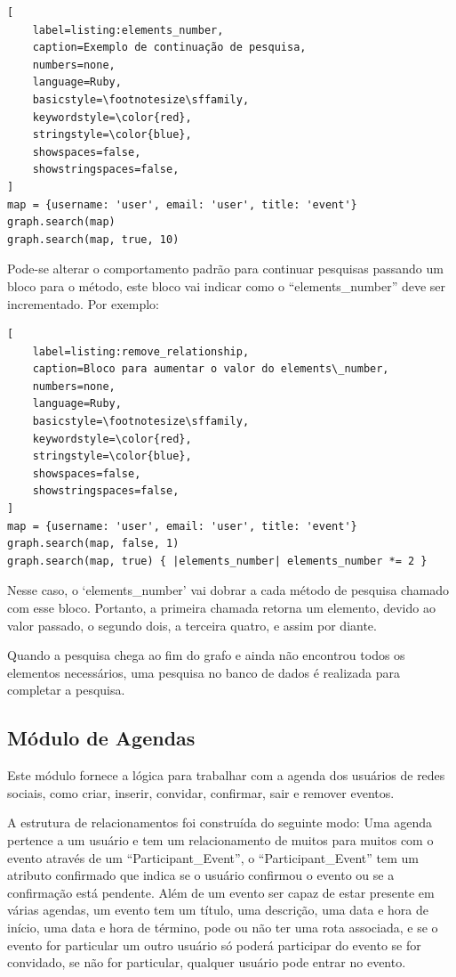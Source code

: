 \begin{lstlisting}[
    label=listing:elements_number,
    caption=Exemplo de continuação de pesquisa,
    numbers=none,
    language=Ruby,
    basicstyle=\footnotesize\sffamily,
    keywordstyle=\color{red},
    stringstyle=\color{blue},
    showspaces=false,
    showstringspaces=false,
]
map = {username: 'user', email: 'user', title: 'event'}
graph.search(map)
graph.search(map, true, 10)
\end{lstlisting}

Pode-se alterar o comportamento padrão para continuar pesquisas passando um bloco para o método, este bloco vai indicar como o ``elements\_number'' deve ser incrementado. Por exemplo:

\begin{lstlisting}[
    label=listing:remove_relationship,
    caption=Bloco para aumentar o valor do elements\_number,
    numbers=none,
    language=Ruby,
    basicstyle=\footnotesize\sffamily,
    keywordstyle=\color{red},
    stringstyle=\color{blue},
    showspaces=false,
    showstringspaces=false,
]
map = {username: 'user', email: 'user', title: 'event'}
graph.search(map, false, 1)
graph.search(map, true) { |elements_number| elements_number *= 2 }
\end{lstlisting}

Nesse caso, o `elements\_number' vai dobrar a cada método de pesquisa chamado com esse bloco. Portanto, a primeira chamada retorna um elemento, devido ao valor passado, o segundo dois, a terceira quatro, e assim por diante.

Quando a pesquisa chega ao fim do grafo e ainda não encontrou todos os elementos necessários, uma pesquisa no banco de dados é realizada para completar a pesquisa.

\subsection{Módulo de Agendas}

Este módulo fornece a lógica para trabalhar com a agenda dos usuários de redes sociais, como criar, inserir, convidar, confirmar, sair e remover eventos.

A estrutura de relacionamentos foi construída do seguinte modo: Uma agenda pertence a um usuário e tem um relacionamento de muitos para muitos com o evento através de um ``Participant\_Event'', o ``Participant\_Event'' tem um atributo confirmado que indica se o usuário confirmou o evento ou se a confirmação está pendente. Além de um evento ser capaz de estar presente em várias agendas, um evento tem um título, uma descrição, uma data e hora de início, uma data e hora de término, pode ou não ter uma rota associada, e se o evento for particular um outro usuário só poderá participar do evento se for convidado, se não for particular, qualquer usuário pode entrar no evento.

